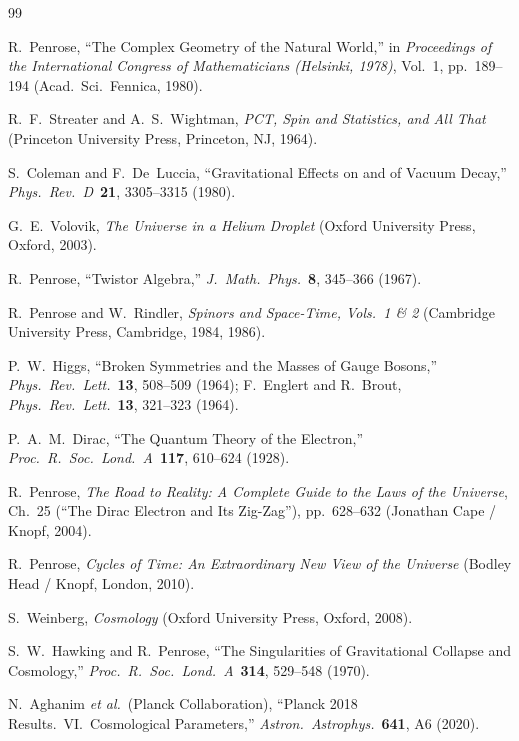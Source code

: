 \documentclass[11pt,a4paper]{article}
\begin{document}
\begin{thebibliography}{99}
\small

R.~Penrose, ``The Complex Geometry of the Natural World,'' in \emph{Proceedings of the International Congress of Mathematicians (Helsinki, 1978)}, Vol.\ 1, pp.\ 189--194 (Acad.\ Sci.\ Fennica, 1980).

R.~F.~Streater and A.~S.~Wightman, \emph{PCT, Spin and Statistics, and All That} (Princeton University Press, Princeton, NJ, 1964).

S.~Coleman and F.~De~Luccia, ``Gravitational Effects on and of Vacuum Decay,'' \emph{Phys.\ Rev.\ D}\ \textbf{21}, 3305--3315 (1980).

G.~E.~Volovik, \emph{The Universe in a Helium Droplet} (Oxford University Press, Oxford, 2003).

R.~Penrose, ``Twistor Algebra,'' \emph{J.\ Math.\ Phys.}\ \textbf{8}, 345--366 (1967).

R.~Penrose and W.~Rindler, \emph{Spinors and Space-Time, Vols.\ 1 \& 2} (Cambridge University Press, Cambridge, 1984, 1986).

P.~W.~Higgs, ``Broken Symmetries and the Masses of Gauge Bosons,'' \emph{Phys.\ Rev.\ Lett.}\ \textbf{13}, 508--509 (1964); F.~Englert and R.~Brout, \emph{Phys.\ Rev.\ Lett.}\ \textbf{13}, 321--323 (1964).

P.~A.~M.~Dirac, ``The Quantum Theory of the Electron,'' \emph{Proc.\ R.\ Soc.\ Lond.\ A}\ \textbf{117}, 610--624 (1928).

R.~Penrose, \emph{The Road to Reality: A Complete Guide to the Laws of the Universe}, Ch.\ 25 (``The Dirac Electron and Its Zig-Zag''), pp.\ 628--632 (Jonathan Cape / Knopf, 2004).

R.~Penrose, \emph{Cycles of Time: An Extraordinary New View of the Universe} (Bodley Head / Knopf, London, 2010).

S.~Weinberg, \emph{Cosmology} (Oxford University Press, Oxford, 2008).

S.~W.~Hawking and R.~Penrose, ``The Singularities of Gravitational Collapse and Cosmology,'' \emph{Proc.\ R.\ Soc.\ Lond.\ A}\ \textbf{314}, 529--548 (1970).

N.~Aghanim \emph{et al.}\ (Planck Collaboration), ``Planck 2018 Results.\ VI.\ Cosmological Parameters,'' \emph{Astron.\ Astrophys.}\ \textbf{641}, A6 (2020).


\end{thebibliography}
\end{document}
